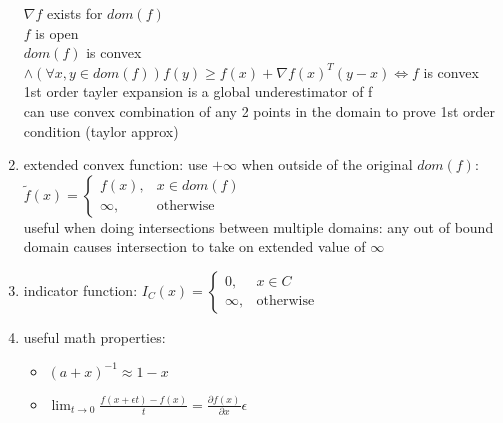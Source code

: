 \documentclass[12pt,letter]{article}
\newcommand{\ppartial}[2]{\frac{\partial #1}{\partial #2}}
\begin{document}
\begin{enumerate}
  $\nabla f$ exists for $dom(f)$\\
  $f$ is open\\
  $dom(f)$ is convex $\wedge (\forall x,y\in dom(f)) f(y) \geq f(x) + \nabla f(x)^T(y-x) \iff f$ is convex\\
  1st order tayler expansion is a global underestimator of f\\
  can use convex combination of any 2 points in the domain to prove 1st order condition (taylor approx)
\item extended convex function: use $+\infty$ when outside of the original $dom(f)$:\\
  $\tilde{f}(x) =
  \begin{cases}
    f(x), & x \in dom(f)\\
    \infty, & \text{otherwise}
  \end{cases}$\\
  useful when doing intersections between multiple domains: any out of bound domain causes intersection to take on extended value of $\infty$
\item indicator function:
  $I_C(x) =
  \begin{cases}
    0, & x \in C\\
    \infty, & \text{otherwise}
  \end{cases}$
\item useful math properties:
  \begin{itemize}
  \item $(a+x)^{-1} \approx 1-x$
  \item $\lim_{t \to 0} \frac{f(x+\epsilon t) - f(x)}{t} = \ppartial{f(x)}{x} \epsilon$
  \end{itemize}
\end{enumerate}
\end{document}
